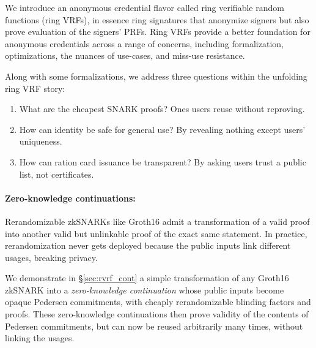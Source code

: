 
\def\qaudbreak{\eprint{\quad}{\\}}


We introduce an anonymous credential flavor called
 ring verifiable random functions (ring VRFs),
in essence ring signatures that anonymize signers but
 also prove evaluation of the signers' PRFs.
Ring VRFs provide a better foundation for anonymous credentials
across a range of concerns, including formalization, optimizations,
the nuances of use-cases, and miss-use resistance.

Along with some formalizations, we address three questions within
the unfolding ring VRF story:
\begin{enumerate} 
\item
What are the cheapest SNARK proofs?  \qaudbreak
Ones users reuse without reproving.
\item
How can identity be safe for general use?  \qaudbreak
By revealing nothing except users' uniqueness.
\item
How can ration card issuance be transparent?  \qaudbreak
By asking users trust a public list, not certificates.
\end{enumerate}

\paragraph{Zero-knowledge continuations:}

Rerandomizable zkSNARKs like Groth16 \cite{Groth16} admit a
transformation of a valid proof into another valid but unlinkable
proof of the exact same statement.  In practice, rerandomization
never gets deployed because the public inputs link different usages,
breaking privacy.

We demonstrate in \S\ref{sec:rvrf_cont} a simple transformation of
any Groth16 zkSNARK into a {\it zero-knowledge continuation} whose
public inputs become opaque Pedersen commitments, with cheaply
rerandomizable blinding factors and proofs.
These zero-knowledge continuations then prove validity of the contents
of Pedersen commitments, but can now be reused arbitrarily many times,
without linking the usages.

